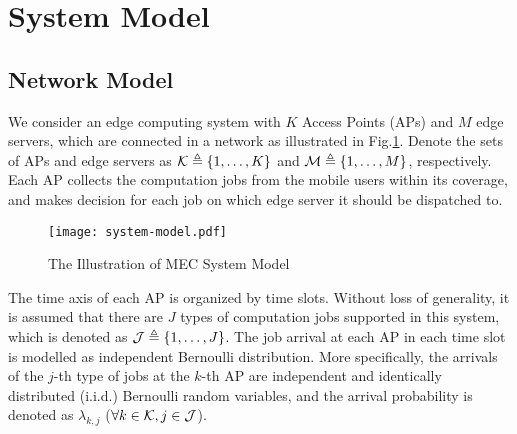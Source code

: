 \section{System Model}
\subsection{Network Model}
We consider an edge computing system with $K$ Access Points (APs) and $M$ edge servers, which are connected in a network as illustrated in Fig.\ref{fig:system}.
Denote the sets of APs and edge servers as $\mathcal{K} \triangleq \{1,\dots,K\}$ and $\mathcal{M} \triangleq \{1,\dots,M\}$, respectively.
Each AP collects the computation jobs from the mobile users within its coverage, and makes decision for each job on which edge server it should be dispatched to.

\begin{figure}[ht]
    \centering
    \texttt{[image: system-model.pdf]}
    \caption{The Illustration of MEC System Model}
    \label{fig:system}
\end{figure}

The time axis of each AP is organized by time slots.
Without loss of generality, it is assumed that there are $J$ types of computation jobs supported in this system, which is denoted as $\mathcal{J} \triangleq \{1,\dots,J\}$.
The job arrival at each AP in each time slot is modelled as independent Bernoulli distribution.
More specifically, the arrivals of the $j$-th type of jobs at the $k$-th AP are independent and identically distributed (i.i.d.) Bernoulli random variables, and the arrival probability is denoted as $\lambda_{k,j}$ ($\forall k\in\mathcal{K}, j\in\mathcal{J}$).


